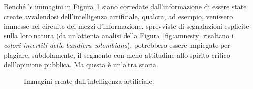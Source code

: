 Benché le immagini in Figura~\ref{fig:concl} siano corredate dall'informazione di essere state create avvalendosi dell'intelligenza artificiale,
qualora, ad esempio, venissero immesse nel circuito dei mezzi d'informazione, sprovviste di segnalazioni esplicite sulla loro natura 
(da un'attenta analisi della Figura~\ref{fig:amnesty} risaltano i \emph{colori invertiti della bandiera colombiana}),
potrebbero essere impiegate per plagiare, subdolamente, il segmento con meno attitudine allo spirito critico dell'opinione pubblica. 
Ma questa è un'altra storia.
\begin{figure}
    \centering
     \quad
    \caption{Immagini create dall'intelligenza artificiale.}
    \label{fig:concl}
\end{figure}